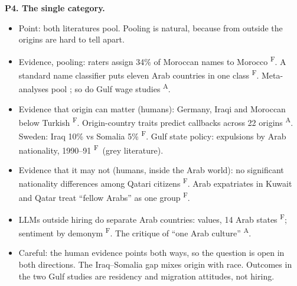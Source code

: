 \documentclass[11pt]{article}
\newcommand{\vF}{\textsuperscript{F}} %
\newcommand{\vA}{\textsuperscript{A}} %
\newcommand{\para}[1]{\smallskip\noindent\textbf{#1}}
\begin{document}
\para{P4. The single category.}
\begin{itemize}
\item Point: both literatures pool. Pooling is natural, because from outside the origins are hard to tell apart.
\item Evidence, pooling: raters assign 34\% of Moroccan names to Morocco \citep{martiniello2022signaling}\vF. A standard name classifier puts eleven Arab countries in one class \citep{ye2017nationality}\vF. Meta-analyses pool \citep{lippens2023state,quillian2023trends}; so do Gulf wage studies \citep{alfarhan2019migrant}\vA.
\item Evidence that origin can matter (humans): Germany, Iraqi and Moroccan below Turkish \citep{koopmans2019taste}\vF. Origin-country traits predict callbacks across 22 origins \citep{distasio2024same}\vA. Sweden: Iraq 10\% vs Somalia 5\% \citep{vernby2019immigrants}\vF. Gulf state policy: expulsions by Arab nationality, 1990--91 \citep{kapiszewski2006arab}\vF\ (grey literature).
\item Evidence that it may not (humans, inside the Arab world): no significant nationality differences among Qatari citizens \citep{shockley2024sharing}\vF. Arab expatriates in Kuwait and Qatar treat ``fellow Arabs'' as one group \citep{blaydes2023arab}\vF.
\item LLMs outside hiring do separate Arab countries: values, 14 Arab states \citep{zahraei2025menavalues}\vF; sentiment by demonym \citep{venkit2023nationality}\vF. The critique of ``one Arab culture'' \citep{keleg2025arabs}\vA.
\item Careful: the human evidence points both ways, so the question is open in both directions. The Iraq--Somalia gap mixes origin with race. Outcomes in the two Gulf studies are residency and migration attitudes, not hiring.
\end{itemize}
\end{document}
